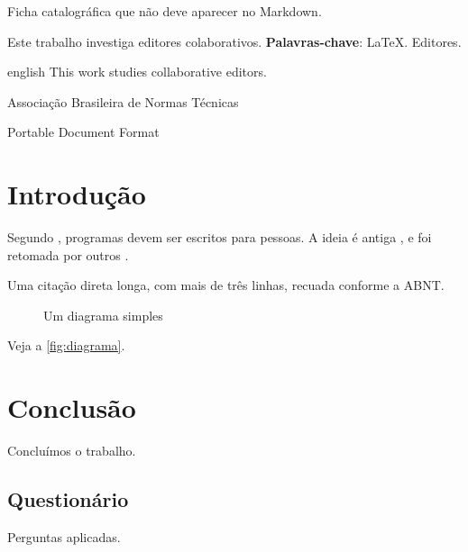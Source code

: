 \documentclass[12pt,oneside,a4paper,english,brazil]{abntex2}
\begin{document}
\pretextual
\imprimircapa
\imprimirfolhaderosto*

\begin{fichacatalografica}
  Ficha catalográfica que não deve aparecer no Markdown.
\end{fichacatalografica}

\begin{resumo}
  Este trabalho investiga editores colaborativos.
  \textbf{Palavras-chave}: LaTeX. Editores.
\end{resumo}

\begin{resumo}[Abstract]
  \begin{otherlanguage*}{english}
    This work studies collaborative editors.
  \end{otherlanguage*}
\end{resumo}

\begin{siglas}
  \item[ABNT] Associação Brasileira de Normas Técnicas
  \item[PDF] Portable Document Format
\end{siglas}

\tableofcontents*

\textual

\chapter{Introdução}\label{cap:intro}

Segundo , programas devem ser escritos para pessoas.
A ideia é antiga \cite{lamport1994}, e foi retomada por outros
.

\begin{citacao}
  Uma citação direta longa, com mais de três linhas, recuada conforme a ABNT.
\end{citacao}

\begin{figure}[htb]
  \caption{Um diagrama simples}\label{fig:diagrama}
  \centering
\end{figure}

Veja a \autoref{fig:diagrama}.

\chapter{Conclusão}

Concluímos o trabalho.

\postextual


\begin{apendicesenv}
\chapter{Questionário}
Perguntas aplicadas.
\end{apendicesenv}
\end{document}
